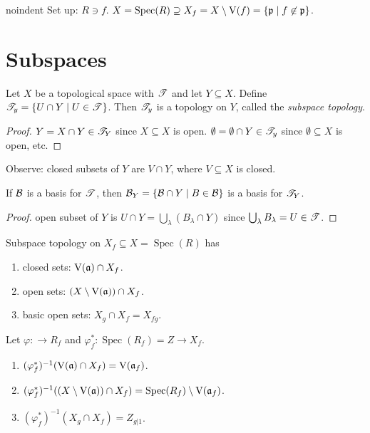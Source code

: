 noindent Set up: $R \ni f$. $X = \operatorname{Spec}(R) \supseteq X_f = X \setminus \operatorname{V}(f) = \{\mathfrak{p} \mid f \not \in \mathfrak{p}\}$.

\section*{Subspaces}

\begin{proposition}
    Let $X$ be a topological space with $\mathscr{T}$ and let $Y \subseteq X$. Define $\mathscr{T}_y = \{U \cap Y \mid U \in \mathscr{T}\}$. Then $\mathscr{T}_y$ is a topology on $Y$, called the \emph{subspace topology}.
\end{proposition}

\begin{proof}
    $Y = X \cap Y \in \mathscr{T}_Y$ since $X \subseteq X$ is open. $\emptyset = \emptyset \cap Y  \in \mathscr{T}_y$ since $\emptyset \subseteq X$ is open, etc. 
\end{proof}

\noindent Observe: closed subsets of $Y$ are $V \cap Y$, where $V \subseteq X$ is closed.

\begin{proposition}
    If $\mathcal{B}$ is a basis for $\mathscr{T}$, then $\mathcal{B}_Y = \{\mathcal{B} \cap Y \mid B \in \mathcal{B}\}$ is a basis for $\mathscr{T}_Y$.
\end{proposition}

\begin{proof}
    open subset of $Y$ is $U \cap Y = \bigcup_\lambda (B_\lambda \cap Y)$ since $\bigcup_\lambda B_\lambda = U \in \mathscr{T}$.
\end{proof}

\begin{corollary}
    Subspace topology on $X_f \subseteq X = \operatorname{Spec}(R)$ has 
    \begin{enumerate}
        \item closed sets: $\operatorname{V}(\mathfrak{a}) \cap X_f$.
        \item open sets: $(X \setminus \operatorname{V}(\mathfrak{a}))\cap X_f$.
        \item basic open sets: $X_g \cap X_f = X_{fg}$.
    \end{enumerate}
\end{corollary}

\begin{proposition}
    Let $\varphi: \to R_f$ and $\varphi_f^*: \operatorname{Spec}(R_f) = Z \to X_f$. 
    \begin{enumerate}
        \item 
            $(\varphi_f^*)^{-1}(\operatorname{V}(\mathfrak{a}) \cap X_f) = \operatorname{V}(\mathfrak{a}_f)$. 
        \item
            $(\varphi_f^*)^{-1}((X \setminus \operatorname{V}(\mathfrak{a})) \cap X_f) = \operatorname{Spec}(R_f) \setminus \operatorname{V}(\mathfrak{a}_f)$.
        \item 
            $(\varphi_f^*)^{-1}(X_g \cap X_f) = Z_{g|1}$.
    \end{enumerate}
\end{proposition}

